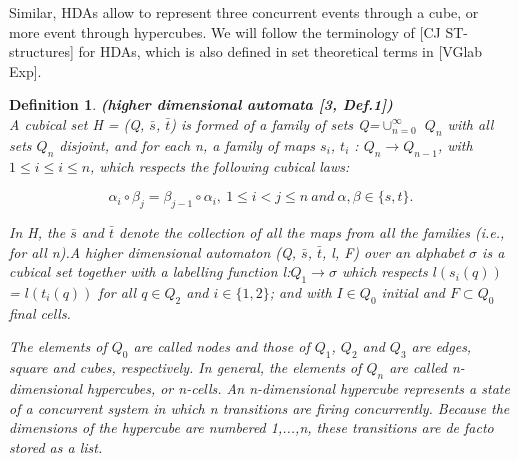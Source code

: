 \documentclass[submission,copyright,creativecommons]{eptcs}
\newtheorem{definition}[theorem]{Definition}
\begin{document}

	Similar, HDAs allow to represent three concurrent events through a cube, or more event through hypercubes. We will follow the terminology of [CJ ST-structures] for HDAs, which is also defined in set theoretical terms in [VGlab Exp].
	

	\begin{definition}{\textbf{(higher dimensional automata [3, Def.1])}}\\
		\indent A cubical set H = (Q, $\bar{s}$, $\bar{t}$) is formed of a family of sets Q=$\cup_{n=0}^{\infty}$ $Q_{n}$ with all sets $Q_{n}$ disjoint, and for each n, a family of maps $s_{i}$, $t_{i}$ : $Q_{n} \rightarrow Q_{n-1}$, with $1 \leq i \leq i \leq n$, which respects the following cubical laws:

		\begin{equation}
		\alpha_{i} \circ \beta_{j} = \beta_{j-1} \circ \alpha_{i},\ 1 \leq i < j \leq n\ and\ \alpha, \beta \in \{s,t\}.
		\end{equation}

		\noindent In H, the $\bar{s}$ and $\bar{t}$ denote the collection of all the maps from all the families (i.e., for all n).A higher dimensional automaton (Q, $\bar{s}$, $\bar{t}$, l, F) over an alphabet $\sigma$ is a cubical set together with a labelling function l:$Q_{1} \rightarrow \sigma$ which respects $l(s_{i}(q))$ = $l(t_{i}(q))$ for all $q \in Q_{2}$ and $i \in \{1,2\}$; and with $I \in Q_{0}$ initial and $F \subset Q_{0}$ final cells.

		The elements of $Q_{0}$ are called nodes and those of $Q_{1}$, $Q_{2}$ and $Q_{3}$ are \emph{edges, square} and \emph{cubes}, respectively. In general, the elements of $Q_{n}$ are called \emph{n-dimensional hypercubes}, or \emph{n-cells}. An n-dimensional hypercube represents a state of a concurrent system in which n transitions are firing concurrently. Because the dimensions of the hypercube are numbered 1,...,n, these transitions are de facto stored as a list.

	\end{definition}
\end{document}

